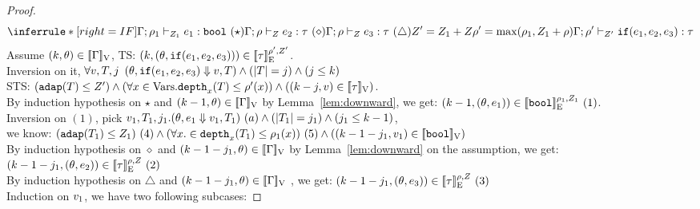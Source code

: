 \documentclass[a4paper,11pt]{article}
\theoremstyle{definition}
\begin{document}
\begin{proof}
\[
    \inferrule*[right = IF]{
      \Gamma; \dmap_1 \tvdash{\nnatA_1} \expr_1: \tbool ~ (\star) \\
      \Gamma; \dmap \tvdash{\nnatA} \expr_2: \type ~(\diamond) \\
      \Gamma; \dmap \tvdash{\nnatA} \expr_3: \type ~(\triangle) \\\\
      \nnatA' = \nnatA_1 + \nnatA \\
      \dmap' = \max(\dmap_1, \nnatA_1 + \dmap)
    }{
      \Gamma; \dmap' \tvdash{\nnatA'} \eif(\expr_1, \expr_2, \expr_3):  \type
    }
\]
Assume $(k, \theta) \in [\![ \Gamma ]\!]_{\text{V}}$, TS: $(k, (\theta, \mathtt{if}(e_1, e_2, e_3))) \in [\![ \tau ]\!]_{\text{E}}^{\rho', Z'}$.\\
%
Inversion on it, $\forall v, T, j$ $(\theta, \mathtt{if}(e_1, e_2, e_3) \mathrel{\Downarrow} v, T) \land (|T| = j) \land (j \leq k)$\\
%
STS: $(\mathtt{adap}(T) \leq Z') \land (\forall x \in \mbox{Vars}. \mathtt{depth}_{x}(T) \leq \rho'(x)) \land ((k - j, v) \in [\![ \tau ]\!]_{\text{V}})$.\\
%
By induction hypothesis on $\star$ and $(k-1, \theta) \in
[\![ \Gamma ]\!]_{\text{V}}$ by  Lemma~\ref{lem:downward}, we get: $(k-1, (\theta, e_1)) \in [\![ \mathtt{bool} ]\!]_{\text{E}}^{\rho_1, Z_1} ~(1)$.\\
%
Inversion on $(1)$, pick $ v_1, T_1, j_1. (\theta, e_1 \mathrel{\Downarrow} v_1, T_1) ~ (a) \land (|T_1| = j_1) \land (j_1 \leq k-1)$,\\
%
we know: $(\mathtt{adap}(T_1) \leq Z_1)~(4) \land (\forall x. \in
\mathtt{depth}_{x}(T_1) \leq \rho_1(x)) ~(5) \land ((k -1- j_1, v_1) \in [\![ \mathtt{bool} ]\!]_{\text{V}})$\\
%
By induction hypothesis on $\diamond$ and $(k-1-j_1, \theta) \in
[\![ \Gamma ]\!]_{\text{V}}$ by Lemma~\ref{lem:downward} on the assumption, we get: $(k-1-j_1, (\theta, e_2)) \in [\![ \tau ]\!]_{\text{E}}^{\rho, Z} ~(2)$\\
%
By induction hypothesis on $\triangle$ and $(k-1-j_1, \theta) \in
[\![ \Gamma ]\!]_{\text{V}}$ , we get: $(k-1-j_1, (\theta, e_3)) \in [\![ \tau ]\!]_{\text{E}}^{\rho, Z} ~(3)$\\
%
Induction on $v_1$, we have two following subcases:


\end{proof}
\end{document}
